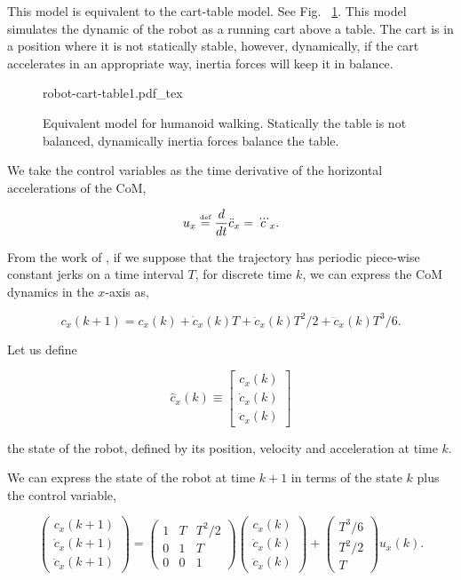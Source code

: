 This model is equivalent to the cart-table model. See Fig. ~\ref{Fig:Inverted-Pendulum-Cart-Table}. This model simulates the dynamic of the robot as a running cart above a table. The cart is in a position where it is not statically stable, however, dynamically, if the cart accelerates in an appropriate way, inertia forces will keep it in balance.

\begin{figure}
  \centering
      {\def\svgwidth{0.5\columnwidth}
        
                   {robot-cart-table1.pdf_tex}}
      \caption[]{Equivalent model for humanoid walking. Statically the table is not balanced, dynamically inertia forces balance the table.}
      \label{Fig:Inverted-Pendulum-Cart-Table}
\end{figure}

We take the control variables as the time derivative of the horizontal accelerations of the CoM,

$$
 u_x \stackrel{\mbox{\tiny def}}{=} \dfrac{d}{dt}\ddot{c}_x = \dddot{c}_x.
$$

From the  work of \citep{Kajita2003}, if we suppose that the trajectory has periodic piece-wise constant jerks on a time interval $T$, for discrete time $k$, we can express the CoM dynamics in the $x$-axis as,

$$
c_x(k+1) = c_x(k) + \dot{c}_x(k) T + \ddot{c}_x(k) T^2/2 + \dddot{c}_x(k) T^3/6.
$$

Let us define

$$
\hat{c}_x(k) \equiv 
\left[
\begin{matrix}
c_x(k) \\ 
\dot{c}_x(k)\\
\ddot{c}_x(k) 
\end{matrix}
\right]
$$ 

the state of the robot, defined by its position, velocity and acceleration at time $k$. 

We can express the state of the robot at time $k+1$ in terms of the state $k$ plus the control variable,

\begin{equation}
\label{Eq:state_dynamics}
\left(
\begin{matrix}
c_x(k+1) \\ 
\dot{c}_x(k+1)\\
\ddot{c}_x(k+1) 
\end{matrix}
\right) =
\left(
\begin{matrix}
1 & T & T^2/2 \\
0 & 1 & T \\
0 & 0 & 1
\end{matrix}
\right)
\left(
\begin{matrix}
c_x(k) \\ 
\dot{c}_x(k)\\
\ddot{c}_x(k) 
\end{matrix}
\right) +
\left(
\begin{matrix}
T^3/6 \\
T^2/2 \\
T
\end{matrix}
\right)
u_x(k).
\end{equation}

